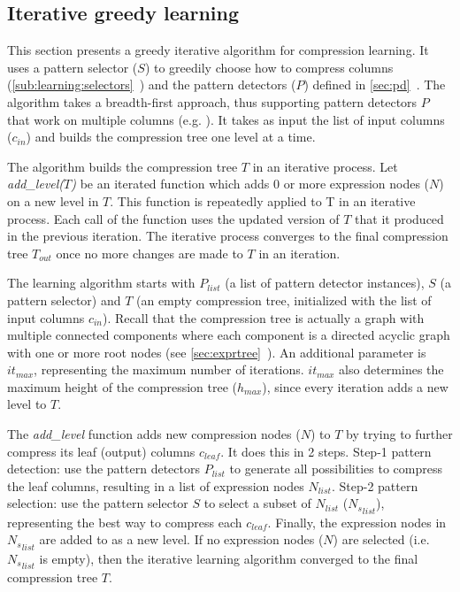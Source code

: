 \subsection{Iterative greedy learning}
\label{sub:learning:iterative}





% 

This section presents a greedy iterative algorithm for compression learning. It uses a pattern selector (\(S\)) to greedily choose how to compress columns (\ref{sub:learning:selectors}~) and the pattern detectors (\(P\)) defined in \ref{sec:pd}~. The algorithm takes a breadth-first approach, thus supporting pattern detectors \(P\) that work on multiple columns (e.g. ). It takes as input the list of input columns (\(c_{in}\)) and builds the compression tree one level at a time.

The algorithm builds the compression tree \(T\) in an iterative process. Let \textit{add\_level(\(T\))} be an iterated function which adds 0 or more expression nodes (\(N\)) on a new level in \(T\). This function is repeatedly applied to T in an iterative process. Each call of the function uses the updated version of \(T\) that it produced in the previous iteration. The iterative process converges to the final compression tree \(T_{out}\) once no more changes are made to \(T\) in an iteration.

The learning algorithm starts with \(P_{list}\) (a list of pattern detector instances), \(S\) (a pattern selector) and \(T\) (an empty compression tree, initialized with the list of input columns \(c_{in}\)). Recall that the compression tree is actually a graph with multiple connected components where each component is a directed acyclic graph with one or more root nodes (see \ref{sec:exprtree}~). An additional parameter is \(it_{max}\), representing the maximum number of iterations. \(it_{max}\) also determines the maximum height of the compression tree (\(h_{max}\)), since every iteration adds a new level to \(T\).

The \textit{add\_level} function adds new compression nodes (\(N\)) to \(T\) by trying to further compress its leaf (output) columns \(c_{leaf}\). It does this in 2 steps. Step-1 pattern detection: use the pattern detectors \(P_{list}\) to generate all possibilities to compress the leaf columns, resulting in a list of expression nodes \(N_{list}\). Step-2 pattern selection: use the pattern selector \(S\) to select a subset of \(N_{list}\) (\({N_{s}}_{list}\)), representing the best way to compress each \(c_{leaf}\). Finally, the expression nodes in \({N_{s}}_{list}\) are added to as a new level. If no expression nodes (\(N\)) are selected (i.e. \({N_{s}}_{list}\) is empty), then the iterative learning algorithm converged to the final compression tree \(T\).

